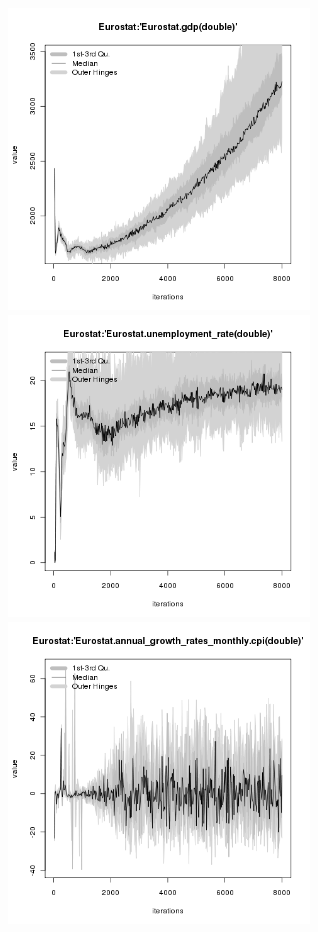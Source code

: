 
\begin{figure}[ht!]
\centering\leavevmode
\begin{minipage}{17cm}
\centering\leavevmode
\includegraphics[width=8cm]{./transient/tax_0.08/Eurostat-gdp.png}
\includegraphics[width=8cm]{./transient/tax_0.08/Eurostat-unemployment_rate.png}\\
\includegraphics[width=8cm]{./transient/tax_0.08/Eurostat-cpi.png}

\end{minipage}
\end{figure}
